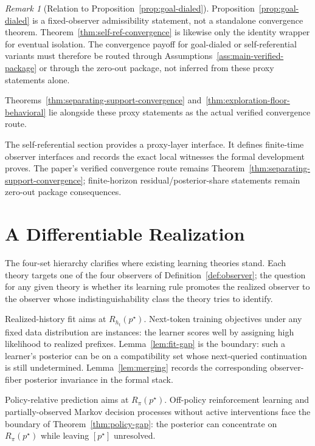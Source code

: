 \documentclass[11pt]{article}
\theoremstyle{definition}
\theoremstyle{remark}
\newtheorem{remark}[theorem]{Remark}
\theoremstyle{plain}
\theoremstyle{definition}
\begin{document}
\begin{remark}[Relation to Proposition~\ref{prop:goal-dialed}]
\label{rem:self-ref-vs-goal-dialed}
Proposition~\ref{prop:goal-dialed} is a fixed-observer admissibility statement, not a standalone convergence theorem. Theorem~\ref{thm:self-ref-convergence} is likewise only the identity wrapper for eventual isolation. The convergence payoff for goal-dialed or self-referential variants must therefore be routed through Assumptions~\ref{ass:main-verified-package} or through the zero-out package, not inferred from these proxy statements alone.
\par
Theorems~\ref{thm:separating-support-convergence} and~\ref{thm:exploration-floor-behavioral} lie alongside these proxy statements as the actual verified convergence route.
\end{remark}

The self-referential section provides a proxy-layer interface. It defines finite-time observer interfaces and records the exact local witnesses the formal development proves. The paper's verified convergence route remains Theorem~\ref{thm:separating-support-convergence}; finite-horizon residual/posterior-share statements remain zero-out package consequences.

\section{A Differentiable Realization}
\label{sec:realization}
\label{sec:amortized-surrogate}

The four-set hierarchy clarifies where existing learning theories stand. Each theory targets one of the four observers of Definition~\ref{def:observer}; the question for any given theory is whether its learning rule promotes the realized observer to the observer whose indistinguishability class the theory tries to identify.

Realized-history fit aims at $R_{h_t}(p^\star)$. Next-token training objectives under any fixed data distribution are instances: the learner scores well by assigning high likelihood to realized prefixes. Lemma~\ref{lem:fit-gap} is the boundary: such a learner's posterior can be on a compatibility set whose next-queried continuation is still undetermined. Lemma~\ref{lem:merging} records the corresponding observer-fiber posterior invariance in the formal stack.

Policy-relative prediction aims at $R_\pi(p^\star)$. Off-policy reinforcement learning and partially-observed Markov decision processes without active interventions face the boundary of Theorem~\ref{thm:policy-gap}: the posterior can concentrate on $R_\pi(p^\star)$ while leaving $[p^\star]$ unresolved.
\end{document}
